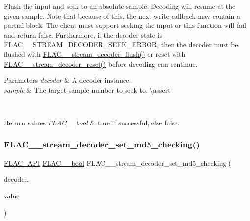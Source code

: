 Flush the input and seek to an absolute sample. Decoding will resume at the given sample. Note that because of this, the next write callback may contain a partial block. The client must support seeking the input or this function will fail and return {\ttfamily false}. Furthermore, if the decoder state is {\ttfamily F\+L\+A\+C\+\_\+\+\_\+\+S\+T\+R\+E\+A\+M\+\_\+\+D\+E\+C\+O\+D\+E\+R\+\_\+\+S\+E\+E\+K\+\_\+\+E\+R\+R\+OR}, then the decoder must be flushed with \mbox{\hyperlink{group__flac__stream__decoder_ga0109ce87f2c648b224b68c08b3c090cb}{F\+L\+A\+C\+\_\+\+\_\+stream\+\_\+decoder\+\_\+flush()}} or reset with \mbox{\hyperlink{group__flac__stream__decoder_ga2342cf4f3caf9ad20fca1373aaea0c27}{F\+L\+A\+C\+\_\+\+\_\+stream\+\_\+decoder\+\_\+reset()}} before decoding can continue.


\begin{DoxyParams}{Parameters}
{\em decoder} & A decoder instance. \\
\hline
{\em sample} & The target sample number to seek to. \textbackslash{}assert 
\begin{DoxyCode}{1}
\end{DoxyCode}
 \\
\hline
\end{DoxyParams}

\begin{DoxyRetVals}{Return values}
{\em F\+L\+A\+C\+\_\+\+\_\+bool} & {\ttfamily true} if successful, else {\ttfamily false}. \\
\hline
\end{DoxyRetVals}
\mbox{\label{group__flac__stream__decoder_ga48074d18a17ea88e8272cc8f865ae6e6}} 
\subsubsection{\texorpdfstring{FLAC\_\_stream\_decoder\_set\_md5\_checking()}{FLAC\_\_stream\_decoder\_set\_md5\_checking()}}
{\footnotesize\ttfamily \mbox{\hyperlink{group__flac__export_ga56ca07df8a23310707732b1c0007d6f5}{F\+L\+A\+C\+\_\+\+A\+PI}} \mbox{\hyperlink{ordinals_8h_a95103469f1cbd78b8cf250194985b34e}{F\+L\+A\+C\+\_\+\+\_\+bool}} F\+L\+A\+C\+\_\+\+\_\+stream\+\_\+decoder\+\_\+set\+\_\+md5\+\_\+checking (\begin{DoxyParamCaption}\item[{\mbox{\hyperlink{struct_f_l_a_c_____stream_decoder}{F\+L\+A\+C\+\_\+\+\_\+\+Stream\+Decoder}} $\ast$}]{decoder,  }\item[{\mbox{\hyperlink{ordinals_8h_a95103469f1cbd78b8cf250194985b34e}{F\+L\+A\+C\+\_\+\+\_\+bool}}}]{value }\end{DoxyParamCaption})}

